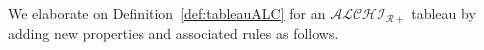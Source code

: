 \documentclass{article}
\newtheorem{mydef}{Definition}
\begin{document}
We elaborate on Definition~\ref{def:tableauALC} for an $\mathcal{ALCHI_{R+}}$ tableau by adding new properties and associated rules as follows.
% 
\end{document}
